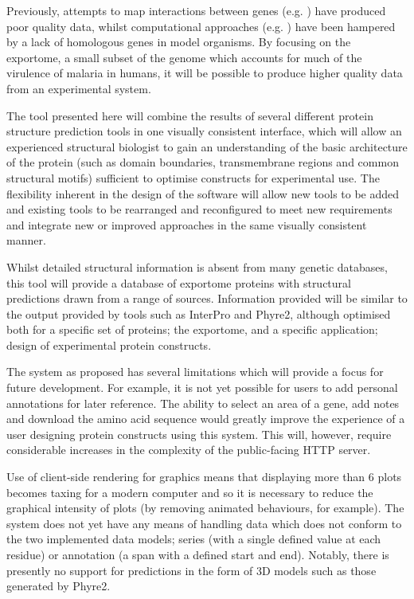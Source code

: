 \documentclass[fleqn,10pt]{article} %
\begin{document}
Previously, attempts to map interactions between \pf genes (e.g. \cite{LaCount2005}) have produced poor quality data, whilst computational approaches (e.g. \cite{Wuchty2007, Date2006}) have been hampered by a lack of homologous genes in model organisms. By focusing on the exportome, a small subset of the \pf genome which accounts for much of the virulence of malaria in humans, it will be possible to produce higher quality data from an experimental system.

The tool presented here will combine the results of several different protein structure prediction tools in one visually consistent interface, which will allow an experienced structural biologist to gain an understanding of the basic architecture of the protein (such as domain boundaries, transmembrane regions and common structural motifs) sufficient to optimise constructs for experimental use. The flexibility inherent in the design of the software will allow new tools to be added and existing tools to be rearranged and reconfigured to meet new requirements and integrate new or improved approaches in the same visually consistent manner.

Whilst detailed structural information is absent from many genetic databases, this tool will provide a database of \pf exportome proteins with structural predictions drawn from a range of sources. Information provided will be similar to the output provided by tools such as InterPro and Phyre2, although optimised both for a specific set of proteins; the \pf exportome, and a specific application; design of experimental protein constructs.

The system as proposed has several limitations which will provide a focus for future development. For example, it is not yet possible for users to add personal annotations for later reference. The ability to select an area of a gene, add notes and download the amino acid sequence would greatly improve the experience of a user designing protein constructs using this system. This will, however, require considerable increases in the complexity of the public-facing HTTP server.

Use of client-side rendering for graphics means that displaying more than 6 plots becomes taxing for a modern computer and so it is necessary to reduce the graphical intensity of plots (by removing animated behaviours, for example). The system does not yet have any means of handling data which does not conform to the two implemented data models; series (with a single defined value at each residue) or annotation (a span with a defined start and end). Notably, there is presently no support for predictions in the form of 3D models such as those generated by Phyre2.
\end{document}
